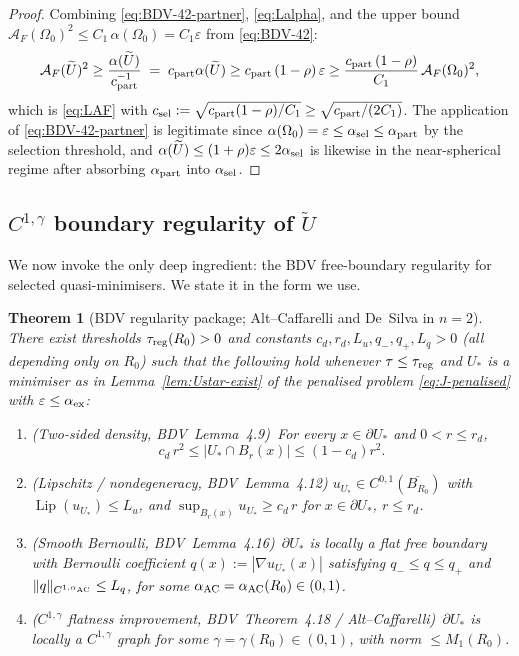 \documentclass[11pt]{amsart}
\newtheorem{theorem}{Theorem}[section]
\newcommand{\AF}{\mathcal A_F}
\newcommand{\wt}{\widetilde}
\DeclareMathOperator{\Lip}{Lip}
\begin{document}
\begin{proof}
Combining \eqref{eq:BDV-42-partner}, \eqref{eq:Lalpha}, and the
upper bound \(\AF(\Omega_0)^2\le C_1\,\alpha(\Omega_0)=C_1\varepsilon\)
from \eqref{eq:BDV-42}:
\[
   \AF(\wt U)^{2}
      \ge\frac{\alpha(\wt U)}{c_{\rm part}^{-1}}
      \;=\;c_{\rm part}\alpha(\wt U)
      \ge c_{\rm part}\,(1-\rho)\,\varepsilon
      \ge\frac{c_{\rm part}\,(1-\rho)}{C_1}\,\AF(\Omega_0)^{2},
\]
which is \eqref{eq:LAF} with
\(c_{\rm sel}:=\sqrt{c_{\rm part}(1-\rho)/C_1}\ge
\sqrt{c_{\rm part}/(2C_1)}\).  The application of
\eqref{eq:BDV-42-partner} is legitimate since
\(\alpha(\Omega_0)=\varepsilon\le\alpha_{\rm sel}\le\alpha_{\rm part}\)
by the selection threshold, and \(\alpha(\wt U)\le(1+\rho)\varepsilon
\le 2\alpha_{\rm sel}\) is likewise in the near-spherical regime after
absorbing \(\alpha_{\rm part}\) into \(\alpha_{\rm sel}\).
\end{proof}

\subsection{\texorpdfstring{$C^{1,\gamma}$}{C1gamma} boundary
regularity of \texorpdfstring{$\wt U$}{Utilde}}\label{ss:C2alpha}

We now invoke the only deep ingredient: the BDV free-boundary
regularity for selected quasi-minimisers.  We state it in the form we
use.

\begin{theorem}[BDV regularity package; Alt--Caffarelli and De~Silva
in \(n=2\)]\label{thm:BDV-reg}
There exist thresholds \(\tau_{\rm reg}(R_0)>0\) and constants
\(c_d,r_d,L_u,q_-,q_+,L_q>0\) (all depending only on \(R_0\)) such that
the following hold whenever \(\tau\le\tau_{\rm reg}\) and \(U_*\) is a
minimiser as in Lemma~\ref{lem:Ustar-exist} of the penalised problem
\eqref{eq:J-penalised} with \(\varepsilon\le\alpha_{\rm ex}\):
\begin{enumerate}[label=\textup{(R\arabic*)}]
\item\label{R1} (Two-sided density, BDV~Lemma~4.9)\ For every
\(x\in\partial U_*\) and \(0<r\le r_d\),
\[
   c_d\,r^2\le|U_*\cap B_r(x)|\le(1-c_d)r^2.
\]
\item\label{R2} (Lipschitz / nondegeneracy, BDV~Lemma~4.12)
\(u_{U_*}\in C^{0,1}(\overline{B_{R_0}})\) with
\(\Lip(u_{U_*})\le L_u\), and
\(\sup_{B_r(x)}u_{U_*}\ge c_d\,r\) for \(x\in\partial U_*\),
\(r\le r_d\).
\item\label{R3} (Smooth Bernoulli, BDV~Lemma~4.16)\ \(\partial U_*\)
is locally a flat free boundary with Bernoulli coefficient
\(q(x):=|\nabla u_{U_*}(x)|\) satisfying \(q_-\le q\le q_+\) and
\(\|q\|_{C^{1,\alpha_{\rm AC}}}\le L_q\), for some
\(\alpha_{\rm AC}=\alpha_{\rm AC}(R_0)\in(0,1)\).
\item\label{R4} (\(C^{1,\gamma}\) flatness improvement,
BDV~Theorem~4.18 / Alt--Caffarelli)\ \(\partial U_*\) is locally a
\(C^{1,\gamma}\) graph for some \(\gamma=\gamma(R_0)\in(0,1)\), with
norm \(\le M_1(R_0)\).
\end{enumerate}
\end{theorem}
\end{document}
